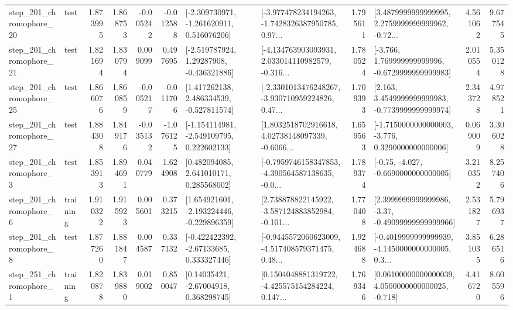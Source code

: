 \begin{tabular}{llrrrrllrlrr}
  step\_201\_chromophore\_20 &      test &      1.873995 &    1.868753 &     -0.005242 & -0.012588 &   [-2.309730971, -1.261620911, 0.516076206] &  [-3.977478234194263, -1.7428326387950785, 0.97... &       1.795611 &  [3.4879999999999995, 2.2759999999999962, -0.72... &            4.561062 &          9.677545 \\
  step\_201\_chromophore\_21 &      test &      1.821694 &    1.830794 &      0.009099 &  0.497695 &    [-2.519787924, 1.29287908, -0.436321886] &  [-4.134763903093931, 2.033014110982579, -0.316... &       1.780524 &   [-3.766, 1.769999999999996, -0.6729999999999983] &            2.010554 &          5.350128 \\
  step\_201\_chromophore\_25 &      test &      1.866076 &    1.860859 &     -0.005217 & -0.011706 &    [1.417262138, 2.486334539, -0.527811574] &  [-2.3301013476248267, -3.930710959224826, 0.47... &       1.709393 &   [2.163, 3.4549999999999983, -0.7739999999999974] &            2.343728 &          4.978521 \\
  step\_201\_chromophore\_27 &      test &      1.884308 &    1.849176 &     -0.035132 & -1.076125 &   [-1.154114981, -2.549109795, 0.222602133] &  [1.8032518702916618, 4.02738148097339, -0.6066... &       1.659563 &  [-1.7150000000000003, -3.776, 0.3290000000000006] &            0.069009 &          3.306028 \\
   step\_201\_chromophore\_3 &      test &      1.853913 &    1.894691 &      0.040779 &  1.624908 &     [0.482094085, 2.641010171, 0.285568002] &  [-0.7959746158347853, -4.390564587138635, -0.0... &       1.789374 &               [-0.75, -4.027, -0.6690000000000005] &            3.210352 &          8.257406 \\
   step\_201\_chromophore\_6 &  training &      1.910322 &    1.915923 &      0.005601 &  0.373215 &   [1.654921601, -2.193224446, -0.229896359] &  [2.738878822145922, -3.587124883852984, -0.101... &       1.770408 &  [2.3999999999999986, -3.37, -0.49099999999999966] &            2.531827 &          5.796937 \\
   step\_201\_chromophore\_8 &      test &      1.877260 &    1.881847 &      0.004587 &  0.337132 &    [-0.422422392, -2.67133685, 0.333327446] &  [-0.9445572060623009, -4.517408579371475, 0.48... &       1.924688 &  [-0.4019999999999939, -4.1450000000000005, 0.3... &            3.851035 &          6.286516 \\
   step\_251\_chromophore\_1 &  training &      1.820878 &    1.839880 &      0.019002 &  0.850047 &      [0.14035421, -2.67004918, 0.368298745] &  [0.1504048881319722, -4.425575154284224, 0.147... &       1.769346 &  [0.06100000000000039, 4.0500000000000025, -0.718] &            4.416720 &          8.605596 \\

\end{tabular}
